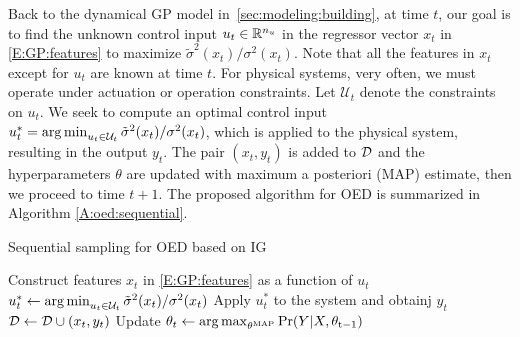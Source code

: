 Back to the dynamical GP model in~\ref{sec:modeling:building}, at time $t$, our goal is to find the unknown control input $u_{t} \in \mathbb{R}^{n_{u}}$ in the regressor vector $x_{t}$ in \eqref{E:GP:features} to maximize \(\tilde{\sigma}^2(x_{t})/{\sigma}^2(x_{t})\).
Note that all the features in $x_{t}$ except for $u_{t}$ are known at time $t$.
For physical systems, very often, we must operate under actuation or operation constraints.
Let $\mathcal{U}_{t}$ denote the constraints on $u_{t}$.
We seek to compute an optimal control input \(u^*_t = \operatorname*{arg\,min}_{u_{t} \in \mathcal{U}_{t}} \tilde{\sigma}^2(x_t)/{\sigma}^2(x_t) \), which is applied to the physical system, resulting in the output $y_{t}$.
The pair $(x_{t}, y_{t})$ is added to $\mathcal{D}$ and the hyperparameters \(\theta\) are updated with maximum a posteriori (MAP) estimate, %
then we proceed to time \(t+1\). 
The proposed algorithm for OED is summarized in Algorithm \ref{A:oed:sequential}.
\begin{algorithm}[!tb]
	\caption{Sequential sampling for OED based on IG}
	\label{A:oed:sequential}
	\begin{algorithmic}[1]
		\State Construct features \(x_t\) in \eqref{E:GP:features} as a function of \(u_t\)
		\State \(u^*_t \leftarrow \operatorname*{arg\,min}_{u_{t} \in \mathcal{U}_{t}} \tilde{\sigma}^2(x_t)/{\sigma}^2(x_t) \)
		\State Apply \(u^*_t\) to the system and obtainj \(y_t\)
		\State \(\mathcal{D} \leftarrow \mathcal{D} \cup (x_t,y_t) \)
		\State Update \( \theta_{t} \leftarrow \operatorname*{arg\,max}_{\theta^{\mathrm{MAP}}} \Pr(Y \vert X, \theta_{\mathrm{t-1}})\)
		\EndWhile
		\EndProcedure
      \end{algorithmic}
\end{algorithm}



